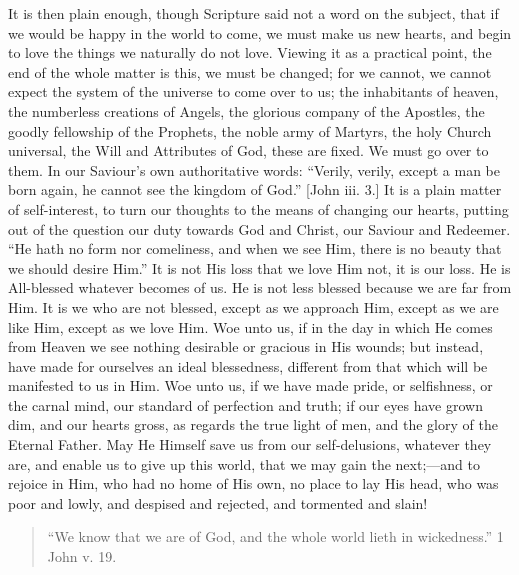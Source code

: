 It is then plain enough, though Scripture said not a word on the
subject, that if we would be happy in the world to come, we must make
us new hearts, and begin to love the things we naturally do not love.
Viewing it as a practical point, the end of the whole matter is this,
we must be changed; for we cannot, we cannot expect the system of the
universe to come over to us; the inhabitants of heaven, the numberless
creations of Angels, the glorious company of the Apostles, the goodly
fellowship of the Prophets, the noble army of Martyrs, the holy Church
universal, the Will and Attributes of God, these are fixed. We must go
over to them. In our Saviour's own authoritative words: ``Verily,
verily, except a man be born again, he cannot see the kingdom of
God.'' [John iii. 3.] It is a plain matter of self-interest, to
turn our thoughts to the means of changing our hearts, putting out of
the question our duty towards God and Christ, our Saviour and
Redeemer. ``He hath no form nor comeliness, and when we see Him,
there is no beauty that we should desire Him.'' It is not His loss
that we love Him not, it is our loss. He is All-blessed whatever
becomes of us. He is not less blessed because we are far from Him. It
is we who are not blessed, except as we approach Him, except as we are
like Him, except as we love Him. Woe unto us, if in the day in which
He comes from Heaven we see nothing desirable or gracious in His
wounds; but instead, have made for ourselves an ideal blessedness,
different from that which will be manifested to us in Him. Woe unto
us, if we have made pride, or selfishness, or the carnal mind, our
standard of perfection and truth; if our eyes have grown dim, and our
hearts gross, as regards the true light of men, and the glory of the
Eternal Father. May He Himself save us from our self-delusions,
whatever they are, and enable us to give up this world, that we may
gain the next;—and to rejoice in Him, who had no home of His own, no
place to lay His head, who was poor and lowly, and despised and
rejected, and tormented and slain!


\begin{quote}

``We know that we are of God, and the whole world lieth in
wickedness.'' 1 John v. 19.

\end{quote}

